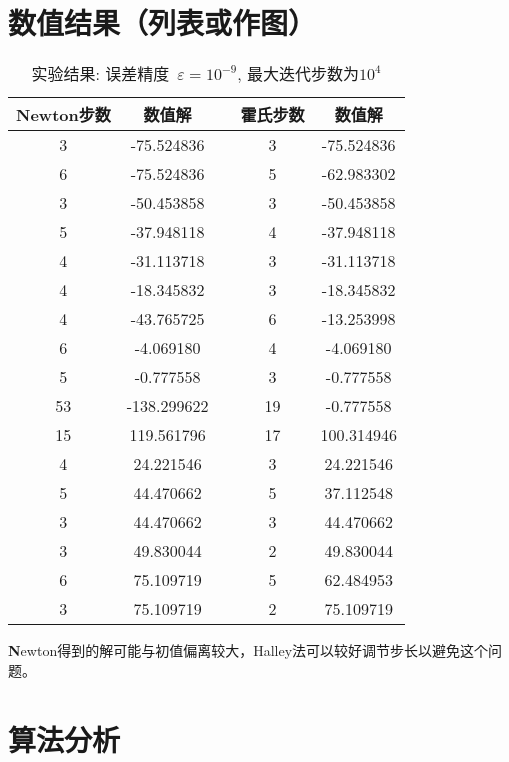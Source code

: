 \documentclass[UTF8]{ctexart}
\begin{document}
\section{数值结果（列表或作图）}
\begin{table}[H]
\centering
\caption{实验结果: 误差精度~$\varepsilon = 10^{-9}$, 最大迭代步数为$10^4$}\begin{tabular}{ccccc}
\hline
Newton步数 & 数值解 & \color{blue}{初始点} & 霍氏步数 & 数值解 \\
\hline
3  & -75.524836 & \color{blue}{-75} & 3  & -75.524836 \\
6  & -75.524836 & \color{blue}{-60} & 5  & -62.983302 \\
3  & -50.453858 & \color{blue}{-50} & 3  & -50.453858 \\
5  & -37.948118 & \color{blue}{-40} & 4  & -37.948118 \\
4  & -31.113718 & \color{blue}{-30} & 3  & -31.113718 \\
4  & -18.345832 & \color{blue}{-20} & 3  & -18.345832 \\
4  & -43.765725 & \color{blue}{-10} & 6  & -13.253998 \\
6  & -4.069180  & \color{blue}{-5}  & 4  & -4.069180 \\
5  & -0.777558  & \color{blue}{0}   & 3  & -0.777558 \\
53 & -138.299622& \color{blue}{6}   & 19 & -0.777558 \\
15 & 119.561796 & \color{blue}{15}  & 17 & 100.314946 \\
4  & 24.221546  & \color{blue}{25}  & 3  & 24.221546 \\
5  & 44.470662  & \color{blue}{35}  & 5  & 37.112548 \\
3  & 44.470662  & \color{blue}{45}  & 3  & 44.470662 \\
3  & 49.830044  & \color{blue}{50}  & 2  & 49.830044 \\
6  & 75.109719  & \color{blue}{60}  & 5  & 62.484953 \\
3  & 75.109719  & \color{blue}{75}  & 2  & 75.109719 \\
\hline
\end{tabular}
\label{tab:tab1}
\end{table}

{\textbf Newton得到的解可能与初值偏离较大，Halley法可以较好调节步长以避免这个问题。}

\section{算法分析}
\end{document}
